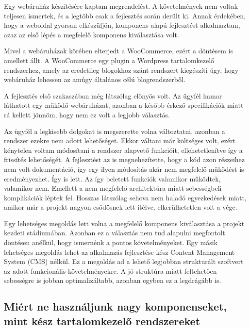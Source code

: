 \documentclass[a4paper,12pt,oneside]{report}
\begin{document}
\begin{justify}
	Egy webáruház készítésére kaptam megrendelést. A követelmények nem voltak teljesen ismertek, és a legtöbb csak a fejlesztés során derült ki. Annak érdekében, hogy a weboldal gyorsan elkészüljön, komponens alapú fejlesztést alkalmaztam, azaz az első lépés a megfelelő komponens kiválasztása volt.

	Mivel a webáruházak körében elterjedt a WooCommerce, ezért a döntésem is amellett állt. A WooCommerce egy plugin a Wordpress tartalomkezelő rendszerhez, amely az eredetileg blogokhoz szánt rendszert kiegészíti úgy, hogy webáruház lehessen az amúgy általános célú blogrendszerből.

	A fejlesztés első szakaszában még látszólag előnyös volt. Az ügyfél hamar láthatott egy működő webáruházat, azonban a később érkező specifikációk miatt rá kellett jönnöm, hogy nem ez volt a legjobb választás. 

	Az ügyfél a legkisebb dolgokat is megszerette volna változtatni, azonban a rendszer ezekre nem adott lehetőséget. Ekkor váltani már költséges volt, ezért kénytelen voltam módosítani a rendszer alapvető funkcióit, ellehetetlenítve így a frissítés lehetőségét. A fejlesztést az is megnehezítette, hogy a kód azon részeihez nem volt dokumentáció, így egy ilyen módosítás akár nem megfelelő működést is eredményezhet. Így is lett. Az így beletett funkciók valamikor működtek, valamikor nem. Emellett a nem megfelelő architektúra miatt sebességbeli komplikációk léptek fel. Hosszas látszólag sehova nem haladó egyezkedések miatt, amikor már a projekt nagyon csődösnek lett ítélve, elkerülhetetlen volt a vége. 

	Egy lehetséges megoldás lett volna a megfelelő komponens kiválasztása a projekt kezdeti stádiumában. Azonban ez a választás nem tud alapulni megfontolt döntésen anélkül, hogy ismernénk a pontos követelményeket. Egy másik lehetséges megoldás lehet az alkalmazás fejlesztése kész Content Management System (CMS) nélkül. Ez a megoldás ad a lehető legjobban strukturált szoftvert az adott funkcionális követelményekre. A jó struktúra miatt feltehetően sebességre is jobban optimalizáltabb, azonban egyben ez a legdrágább is.
\end{justify}

\newpage
\subsection{Miért ne használjunk nagy komponenseket, mint kész tartalomkezelő rendszereket}
\end{document}
